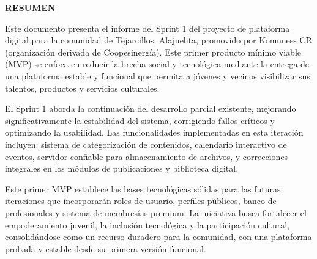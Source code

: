 \begin{center}
\thispagestyle{empty}
\vspace{2cm}
\LARGE{\textbf{RESUMEN}}\\[1.0cm]
\end{center}
\thispagestyle{empty}
Este documento presenta el informe del Sprint 1 del proyecto de plataforma digital para la comunidad de Tejarcillos, Alajuelita, promovido por Komuness CR (organización derivada de Coopesinergía). Este primer producto mínimo viable (MVP) se enfoca en reducir la brecha social y tecnológica mediante la entrega de una plataforma estable y funcional que permita a jóvenes y vecinos visibilizar sus talentos, productos y servicios culturales.

El Sprint 1 aborda la continuación del desarrollo parcial existente, mejorando significativamente la estabilidad del sistema, corrigiendo fallos críticos y optimizando la usabilidad. Las funcionalidades implementadas en esta iteración incluyen: sistema de categorización de contenidos, calendario interactivo de eventos, servidor confiable para almacenamiento de archivos, y correcciones integrales en los módulos de publicaciones y biblioteca digital.

Este primer MVP establece las bases tecnológicas sólidas para las futuras iteraciones que incorporarán roles de usuario, perfiles públicos, banco de profesionales y sistema de membresías premium. La iniciativa busca fortalecer el empoderamiento juvenil, la inclusión tecnológica y la participación cultural, consolidándose como un recurso duradero para la comunidad, con una plataforma probada y estable desde su primera versión funcional.